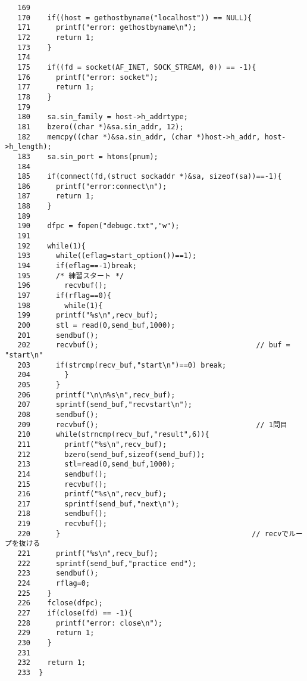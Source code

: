 \documentclass[a4j]{jarticle}
\begin{document}
{\begin{verbatim}
   169	
   170	  if((host = gethostbyname("localhost")) == NULL){
   171	    printf("error: gethostbyname\n");
   172	    return 1;
   173	  }
   174	
   175	  if((fd = socket(AF_INET, SOCK_STREAM, 0)) == -1){
   176	    printf("error: socket");
   177	    return 1;
   178	  }
   179	
   180	  sa.sin_family = host->h_addrtype;
   181	  bzero((char *)&sa.sin_addr, 12);
   182	  memcpy((char *)&sa.sin_addr, (char *)host->h_addr, host->h_length);
   183	  sa.sin_port = htons(pnum);
   184	
   185	  if(connect(fd,(struct sockaddr *)&sa, sizeof(sa))==-1){
   186	    printf("error:connect\n");
   187	    return 1;
   188	  }
   189	
   190	  dfpc = fopen("debugc.txt","w");
   191	
   192	  while(1){
   193	    while((eflag=start_option())==1);
   194	    if(eflag==-1)break;
   195	    /* 練習スタート */
   196	      recvbuf();                                      
   197	    if(rflag==0){
   198	      while(1){
   199		printf("%s\n",recv_buf);
   200		stl = read(0,send_buf,1000);
   201		sendbuf();                                     
   202		recvbuf();                                     // buf = "start\n"
   203		if(strcmp(recv_buf,"start\n")==0) break;
   204	      }
   205	    }
   206	    printf("\n\n%s\n",recv_buf);
   207	    sprintf(send_buf,"recvstart\n");
   208	    sendbuf();
   209	    recvbuf();                                     // 1問目
   210	    while(strncmp(recv_buf,"result",6)){
   211	      printf("%s\n",recv_buf);
   212	      bzero(send_buf,sizeof(send_buf));
   213	      stl=read(0,send_buf,1000);
   214	      sendbuf();
   215	      recvbuf();
   216	      printf("%s\n",recv_buf);
   217	      sprintf(send_buf,"next\n");
   218	      sendbuf();
   219	      recvbuf();
   220	    }                                             // recvでループを抜ける
   221	    printf("%s\n",recv_buf);
   222	    sprintf(send_buf,"practice end");
   223	    sendbuf();
   224	    rflag=0;
   225	  }
   226	  fclose(dfpc);  
   227	  if(close(fd) == -1){
   228	    printf("error: close\n");
   229	    return 1;
   230	  }
   231	  
   232	  return 1;
   233	}
\end{verbatim}
}
\end{document}
